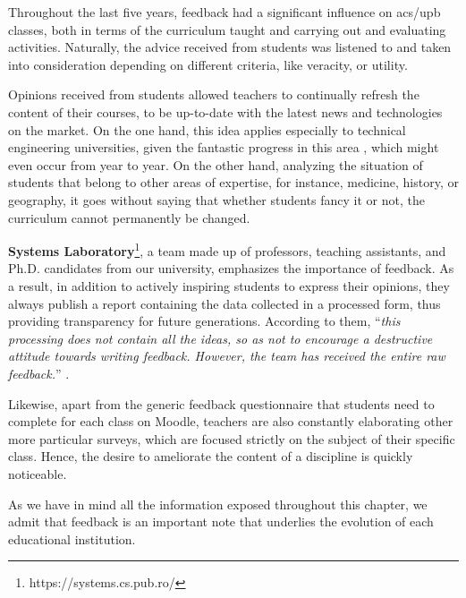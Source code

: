     Throughout the last five years, feedback had a significant influence on \acrshort{acs}/\acrshort{upb} classes, both in terms of the curriculum taught and carrying out and evaluating activities. Naturally, the advice received from students was listened to and taken into consideration depending on different criteria, like veracity, or utility.
    
    Opinions received from students allowed teachers to continually refresh the content of their courses, to be up-to-date with the latest news and technologies on the market. On the one hand, this idea applies especially to technical engineering universities, given the fantastic progress in this area \cite{brian2009technology}, which might even occur from year to year. On the other hand, analyzing the situation of students that belong to other areas of expertise, for instance, medicine, history, or geography, it goes without saying that whether students fancy it or not, the curriculum cannot permanently be changed.
    
	\textbf{Systems Laboratory}\footnote{https://systems.cs.pub.ro/}, a team made up of professors, teaching assistants, and Ph.D. candidates from our university, emphasizes the importance of feedback. As a result, in addition to actively inspiring students to express their opinions, they always publish a report containing the data collected in a processed form, thus providing transparency for future generations. According to them, “\textit{this processing does not contain all the ideas, so as not to encourage a destructive attitude towards writing feedback. However, the team has received the entire raw feedback.}” \cite{wiki2020so}.
	
	Likewise, apart from the generic feedback questionnaire that students need to complete for each class on Moodle, teachers are also constantly elaborating other more particular surveys, which are focused strictly on the subject of their specific class. Hence, the desire to ameliorate the content of a discipline is quickly noticeable.
	
    As we have in mind all the information exposed throughout this chapter, we admit that feedback is an important note that underlies the evolution of each educational institution.
